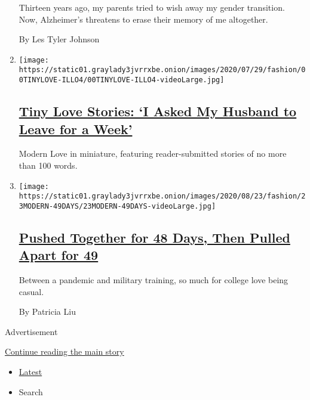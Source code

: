\begin{enumerate}
  Thirteen years ago, my parents tried to wish away my gender
  transition. Now, Alzheimer's threatens to erase their memory of me
  altogether.

  By Les Tyler Johnson
\item
  \texttt{[image: https://static01.graylady3jvrrxbe.onion/images/2020/07/29/fashion/00TINYLOVE-ILLO4/00TINYLOVE-ILLO4-videoLarge.jpg]}

  \hypertarget{tiny-love-stories-i-asked-my-husband-to-leave-for-a-week}{%
  \subsection{\texorpdfstring{\href{/2020/08/25/style/tiny-modern-love-stories-i-asked-my-husband-to-leave.html}{Tiny
  Love Stories: `I Asked My Husband to Leave for a
  Week'}}{Tiny Love Stories: `I Asked My Husband to Leave for a Week'}}\label{tiny-love-stories-i-asked-my-husband-to-leave-for-a-week}}

  Modern Love in miniature, featuring reader-submitted stories of no
  more than 100 words.
\item
  \texttt{[image: https://static01.graylady3jvrrxbe.onion/images/2020/08/23/fashion/23MODERN-49DAYS/23MODERN-49DAYS-videoLarge.jpg]}

  \hypertarget{pushed-together-for-48-days-then-pulled-apart-for-49}{%
  \subsection{\texorpdfstring{\href{/2020/08/21/style/modern-love-pushed-together-pulled-apart-for-49-days.html}{Pushed
  Together for 48 Days, Then Pulled Apart for
  49}}{Pushed Together for 48 Days, Then Pulled Apart for 49}}\label{pushed-together-for-48-days-then-pulled-apart-for-49}}

  Between a pandemic and military training, so much for college love
  being casual.

  By Patricia Liu
\end{enumerate}

Advertisement

\protect\hyperlink{after-mid1}{Continue reading the main story}

\begin{itemize}
\tightlist
\item
  \protect\hyperlink{stream-panel}{Latest}
\item
  Search
\end{itemize}

